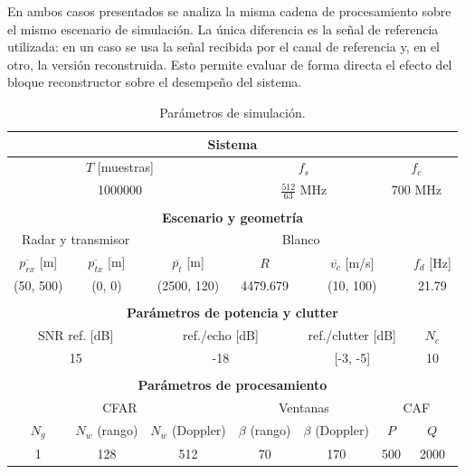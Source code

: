 En ambos casos presentados se analiza la misma cadena de procesamiento sobre el mismo escenario de simulación. La única diferencia es la señal de referencia utilizada: en un caso se usa la señal recibida por el canal de referencia y, en el otro, la versión reconstruida. Esto permite evaluar de forma directa el efecto del bloque reconstructor sobre el desempeño del sistema.


\begin{table}[H] 
\centering
\renewcommand{\arraystretch}{1.2}
\caption{Parámetros de simulación.} 
\label{tab:sim_params} 
\begin{tabular}{|c|c|c|c|c|c|c|} 
    \hline
    \multicolumn{7}{|c|}{\textbf{Sistema}} \\\hline
    \multicolumn{3}{|c|}{\rule[-1.2ex]{0pt}{4.2ex}$T$ [muestras]} &
    \multicolumn{2}{c|}{\rule[-1.2ex]{0pt}{4.2ex}$f_s$} &
    \multicolumn{2}{c|}{\rule[-1.2ex]{0pt}{4.2ex}$f_c$} \\\hline
    \multicolumn{3}{|c|}{\rule[-1.6ex]{0pt}{5ex}1000000} &
    \multicolumn{2}{c|}{\rule[-1.6ex]{0pt}{5ex}$\frac{512}{63}$ MHz} &
    \multicolumn{2}{c|}{\rule[-1.6ex]{0pt}{5ex}700 MHz} \\\hline
    \multicolumn{7}{c}{} \\\hline 
    
    \multicolumn{7}{|c|}{\textbf{Escenario y geometría}} \\\hline  
    \multicolumn{2}{|c|}{Radar y transmisor} & \multicolumn{5}{c|}{Blanco} \\\hline 
    $\overline{p_{rx}}$ [m] & $\overline{p_{tx}}$ [m] & $\overline{p_t}$ [m]& $R$& \multicolumn{2}{c|}{$\overline{v_c}$ [m/s]} & $f_d$ [Hz] \\\hline 
    (50, 500) & (0, 0) & (2500, 120) &4479.679 & \multicolumn{2}{c|}{(10, 100)} & 21.79 \\\hline
    \multicolumn{7}{c}{} \\\hline 

    \multicolumn{7}{|c|}{\textbf{Parámetros de potencia y clutter}} \\\hline 
    \multicolumn{2}{|c|}{SNR ref. [dB]} & \multicolumn{2}{c|}{ref./echo [dB]} & \multicolumn{2}{c|}{ref./clutter [dB]} & $N_c$ \\\hline 
    \multicolumn{2}{|c|}{15} & \multicolumn{2}{c|}{-18} & \multicolumn{2}{c|}{[-3, -5]} & 10 \\\hline 
    \multicolumn{7}{c}{} \\\hline 
    \multicolumn{7}{|c|}{\textbf{Parámetros de procesamiento}} \\\hline \multicolumn{3}{|c|}{CFAR} & \multicolumn{2}{c|}{Ventanas} & \multicolumn{2}{c|}{CAF} \\\hline 
    $N_g$ & $N_w$ (rango) & $N_w$ (Doppler) & $\beta$ (rango) & $\beta$ (Doppler) & $P$ & $Q$ \\\hline 
    1 & 128 & 512 & 70 & 170 & 500 & 2000 \\\hline 
\end{tabular} 
\end{table}
\newpage
